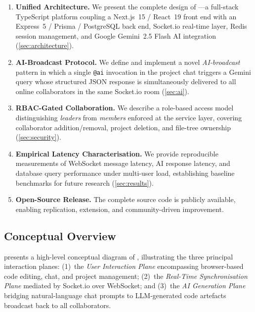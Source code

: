 \begin{enumerate}[leftmargin=*, label=\textbf{C\arabic*.}]
  \item \textbf{Unified Architecture.} We present the complete design of
    \echoray---a full-stack TypeScript platform coupling a Next.js~15 /
    React~19 front end with an Express~5 / Prisma / PostgreSQL back end,
    Socket.io real-time layer, Redis session management, and Google Gemini~2.5
    Flash AI integration (\cref{sec:architecture}).

  \item \textbf{AI-Broadcast Protocol.} We define and implement a novel
    \emph{AI-broadcast} pattern in which a single \texttt{@ai} invocation in
    the project chat triggers a Gemini query whose structured JSON response is
    simultaneously delivered to all online collaborators in the same Socket.io
    room (\cref{sec:ai}).

  \item \textbf{RBAC-Gated Collaboration.} We describe a role-based access
    model distinguishing \emph{leaders} from \emph{members} enforced at the
    service layer, covering collaborator addition/removal, project deletion, and
    file-tree ownership (\cref{sec:security}).

  \item \textbf{Empirical Latency Characterisation.} We provide reproducible
    measurements of WebSocket message latency, AI response latency, and
    database query performance under multi-user load, establishing baseline
    benchmarks for future research (\cref{sec:results}).

  \item \textbf{Open-Source Release.} The complete source code is publicly
    available, enabling replication, extension, and community-driven
    improvement.
\end{enumerate}

\subsection{Conceptual Overview}

 presents a high-level conceptual diagram of \echoray,
illustrating the three principal interaction planes: (1)~the \emph{User
Interaction Plane} encompassing browser-based code editing, chat, and project
management; (2)~the \emph{Real-Time Synchronisation Plane} mediated by
Socket.io over WebSocket; and (3)~the \emph{AI Generation Plane} bridging
natural-language chat prompts to LLM-generated code artefacts broadcast back
to all collaborators.

